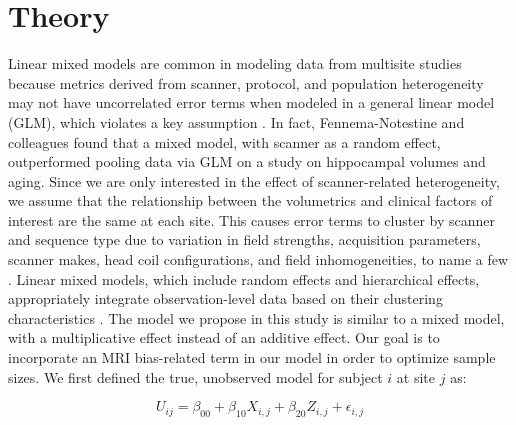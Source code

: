 \documentclass{article}
\begin{document}
\section{Theory}
Linear mixed models are common in modeling data from multisite studies because metrics derived from scanner, protocol, and population heterogeneity may not have uncorrelated error terms when modeled in a general linear model (GLM), which violates a key assumption \cite{garson2013fundamentals}. In fact, Fennema-Notestine and colleagues found that a mixed model, with scanner as a random effect, outperformed pooling data via GLM\cite{fennema2007feasibility} on a study on hippocampal volumes and aging. Since we are only interested in the effect of scanner-related heterogeneity, we assume that the relationship between the volumetrics and clinical factors of interest are the same at each site. This causes error terms to cluster by scanner and sequence type due to variation in field strengths, acquisition parameters, scanner makes, head coil configurations, and field inhomogeneities, to name a few \cite{cannon2014}. Linear mixed models, which include random effects and hierarchical effects, appropriately integrate observation-level data based on their clustering characteristics \cite{garson2013fundamentals}. The model we propose in this study is similar to a mixed model, with a multiplicative effect instead of an additive effect. Our goal is to incorporate an MRI bias-related term in our model in order to optimize sample sizes.
We first defined the true, unobserved model for subject $i$ at site $j$ as:

\begin{equation}
U_{ij} = \beta_{00} + \beta_{10}X_{i,j} + \beta_{20}Z_{i,j} + \epsilon_{i,j}
\end{equation}
\end{document}
